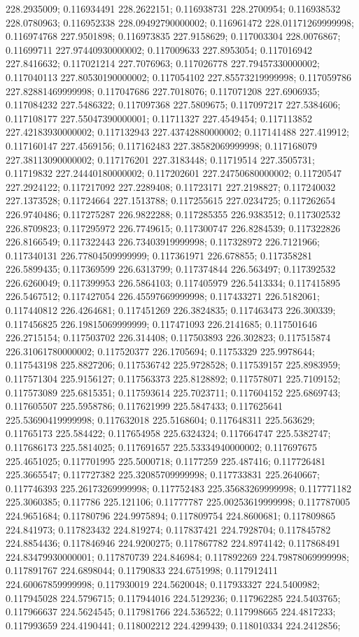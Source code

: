 228.2935009; 0.116934491 228.2622151; 0.116938731 228.2700954; 0.116938532 228.0780963; 0.116952338 228.09492790000002; 0.116961472 228.01171269999998; 0.116974768 227.9501898; 0.116973835 227.9158629; 0.117003304 228.0076867; 0.11699711 227.97440930000002; 0.117009633 227.8953054; 0.117016942 227.8416632; 0.117021214 227.7076963; 0.117026778 227.79457330000002; 0.117040113 227.80530190000002; 0.117054102 227.85573219999998; 0.117059786 227.82881469999998; 0.117047686 227.7018076; 0.117071208 227.6906935; 0.117084232 227.5486322; 0.117097368 227.5809675; 0.117097217 227.5384606; 0.117108177 227.55047390000001; 0.11711327 227.4549454; 0.117113852 227.42183930000002; 0.117132943 227.43742880000002; 0.117141488 227.419912; 0.117160147 227.4569156; 0.117162483 227.38582069999998; 0.117168079 227.38113090000002; 0.117176201 227.3183448; 0.11719514 227.3505731; 0.11719832 227.24440180000002; 0.117202601 227.24750680000002; 0.11720547 227.2924122; 0.117217092 227.2289408; 0.11723171 227.2198827; 0.117240032 227.1373528; 0.11724664 227.1513788; 0.117255615 227.0234725; 0.117262654 226.9740486; 0.117275287 226.9822288; 0.117285355 226.9383512; 0.117302532 226.8709823; 0.117295972 226.7749615; 0.117300747 226.8284539; 0.117322826 226.8166549; 0.117322443 226.73403919999998; 0.117328972 226.7121966; 0.117340131 226.77804509999999; 0.117361971 226.678855; 0.117358281 226.5899435; 0.117369599 226.6313799; 0.117374844 226.563497; 0.117392532 226.6260049; 0.117399953 226.5864103; 0.117405979 226.5413334; 0.117415895 226.5467512; 0.117427054 226.45597669999998; 0.117433271 226.5182061; 0.117440812 226.4264681; 0.117451269 226.3824835; 0.117463473 226.300339; 0.117456825 226.19815069999999; 0.117471093 226.2141685; 0.117501646 226.2715154; 0.117503702 226.314408; 0.117503893 226.302823; 0.117515874 226.31061780000002; 0.117520377 226.1705694; 0.11753329 225.9978644; 0.117543198 225.8827206; 0.117536742 225.9728528; 0.117539157 225.8983959; 0.117571304 225.9156127; 0.117563373 225.8128892; 0.117578071 225.7109152; 0.117573089 225.6815351; 0.117593614 225.7023711; 0.117604152 225.6869743; 0.117605507 225.5958786; 0.117621999 225.5847433; 0.117625641 225.53690419999998; 0.117632018 225.5168604; 0.117648311 225.563629; 0.11765173 225.584422; 0.117654958 225.6324324; 0.117664747 225.5382747; 0.117686173 225.5814025; 0.117691657 225.53334940000002; 0.117697675 225.4651025; 0.117701995 225.5000718; 0.1177259 225.487416; 0.117726481 225.3665547; 0.117727382 225.32085709999998; 0.117733831 225.2640667; 0.117746393 225.26173269999998; 0.117752483 225.35683269999998; 0.117771182 225.3060385; 0.117786 225.121106; 0.11777787 225.00253619999998; 0.117787005 224.9651684; 0.11780796 224.9975894; 0.117809754 224.8600681; 0.117809865 224.841973; 0.117823432 224.819274; 0.117837421 224.7928704; 0.117845782 224.8854436; 0.117846946 224.9200275; 0.117867782 224.8974142; 0.117868491 224.83479930000001; 0.117870739 224.846984; 0.117892269 224.79878069999998; 0.117891767 224.6898044; 0.11790833 224.6751998; 0.117912411 224.60067859999998; 0.117930019 224.5620048; 0.117933327 224.5400982; 0.117945028 224.5796715; 0.117944016 224.5129236; 0.117962285 224.5403765; 0.117966637 224.5624545; 0.117981766 224.536522; 0.117998665 224.4817233; 0.117993659 224.4190441; 0.118002212 224.4299439; 0.118010334 224.2412856; 